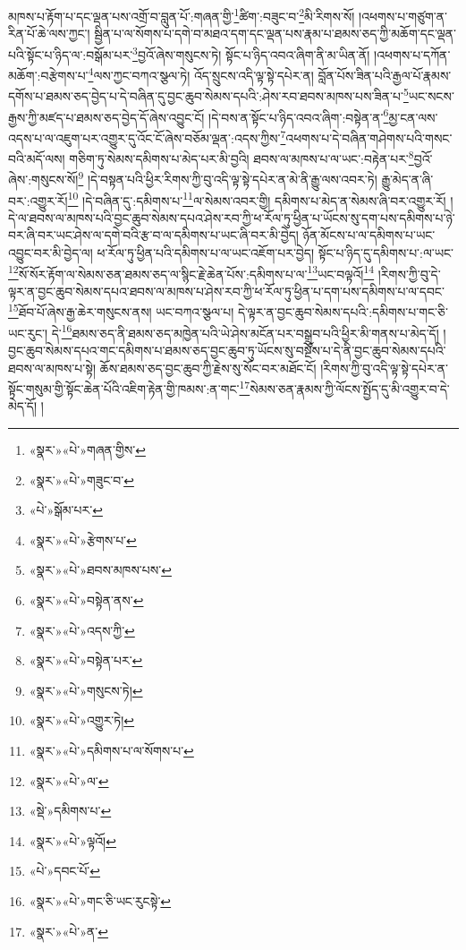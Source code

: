 མཁས་པ་རྟོག་པ་དང་ལྡན་པས་འགྲོ་བ་བླུན་པོ་:གཞན་གྱི་\footnote{«སྣར་»«པེ་»གཞན་གྱིས་}ཚིག་:བཟུང་བ་\footnote{«སྣར་»«པེ་»གཟུང་བ་}མི་རིགས་སོ། །འཕགས་པ་གཙུག་ན་རིན་པོ་ཆེ་ལས་ཀྱང་། སྦྱིན་པ་ལ་སོགས་པ་དགེ་བ་མཐའ་དག་དང་ལྡན་པས་རྣམ་པ་ཐམས་ཅད་ཀྱི་མཆོག་དང་ལྡན་པའི་སྟོང་པ་ཉིད་ལ་:བསྒོམ་པར་\footnote{«པེ་»སྒོམ་པར་}བྱའོ་ཞེས་གསུངས་ཏེ། སྟོང་པ་ཉིད་འབའ་ཞིག་ནི་མ་ཡིན་ནོ། །འཕགས་པ་དཀོན་མཆོག་:བརྩེགས་པ་\footnote{«སྣར་»«པེ་»རྩེགས་པ་}ལས་ཀྱང་བཀའ་སྩལ་ཏེ། འོད་སྲུངས་འདི་ལྟ་སྟེ་དཔེར་ན། བློན་པོས་ཟིན་པའི་རྒྱལ་པོ་རྣམས་དགོས་པ་ཐམས་ཅད་བྱེད་པ་དེ་བཞིན་དུ་བྱང་ཆུབ་སེམས་དཔའི་:ཤེས་རབ་ཐབས་མཁས་པས་ཟིན་པ་\footnote{«སྣར་»«པེ་»ཐབས་མཁས་པས་}ཡང་སངས་རྒྱས་ཀྱི་མཛད་པ་ཐམས་ཅད་བྱེད་དོ་ཞེས་འབྱུང་ངོ། །དེ་བས་ན་སྟོང་པ་ཉིད་འབའ་ཞིག་:བསྟེན་ན་\footnote{«སྣར་»«པེ་»བསྟེན་ནས་}མྱ་ངན་ལས་འདས་པ་ལ་འཇུག་པར་འགྱུར་དུ་འོང་ངོ་ཞེས་བཅོམ་ལྡན་:འདས་ཀྱིས་\footnote{«སྣར་»«པེ་»འདས་ཀྱི་}འཕགས་པ་དེ་བཞིན་གཤེགས་པའི་གསང་བའི་མདོ་ལས། གཅིག་ཏུ་སེམས་དམིགས་པ་མེད་པར་མི་བྱའི། ཐབས་ལ་མཁས་པ་ལ་ཡང་:བརྟེན་པར་\footnote{«སྣར་»«པེ་»བསྟེན་པར་}བྱའོ་ཞེས་:གསུངས་སོ།\footnote{«སྣར་»«པེ་»གསུངས་ཏེ།} །དེ་བསྟན་པའི་ཕྱིར་རིགས་ཀྱི་བུ་འདི་ལྟ་སྟེ་དཔེར་ན་མེ་ནི་རྒྱུ་ལས་འབར་ཏེ། རྒྱུ་མེད་ན་ཞི་བར་:འགྱུར་རོ།\footnote{«སྣར་»«པེ་»འགྱུར་ཏེ།} །དེ་བཞིན་དུ་:དམིགས་པ་\footnote{«སྣར་»«པེ་»དམིགས་པ་ལ་སོགས་པ་}ལ་སེམས་འབར་གྱི། དམིགས་པ་མེད་ན་སེམས་ཞི་བར་འགྱུར་རོ། །དེ་ལ་ཐབས་ལ་མཁས་པའི་བྱང་ཆུབ་སེམས་དཔའ་ཤེས་རབ་ཀྱི་ཕ་རོལ་ཏུ་ཕྱིན་པ་ཡོངས་སུ་དག་པས་དམིགས་པ་ཉེ་བར་ཞི་བར་ཡང་ཤེས་ལ་དགེ་བའི་རྩ་བ་ལ་དམིགས་པ་ཡང་ཞི་བར་མི་བྱེད། ཉོན་མོངས་པ་ལ་དམིགས་པ་ཡང་འབྱུང་བར་མི་བྱེད་ལ། ཕ་རོལ་ཏུ་ཕྱིན་པའི་དམིགས་པ་ལ་ཡང་འཇོག་པར་བྱེད། སྟོང་པ་ཉིད་དུ་དམིགས་པ་:ལ་ཡང་\footnote{«སྣར་»«པེ་»ལ་}སོ་སོར་རྟོག་ལ་སེམས་ཅན་ཐམས་ཅད་ལ་སྙིང་རྗེ་ཆེན་པོས་:དམིགས་པ་ལ་\footnote{«སྡེ་»དམིགས་པ་}ཡང་བལྟའོ།\footnote{«སྣར་»«པེ་»ལྟའོ།} །རིགས་ཀྱི་བུ་དེ་ལྟར་ན་བྱང་ཆུབ་སེམས་དཔའ་ཐབས་ལ་མཁས་པ་ཤེས་རབ་ཀྱི་ཕ་རོལ་ཏུ་ཕྱིན་པ་དག་པས་དམིགས་པ་ལ་དབང་\footnote{«པེ་»དབང་པོ་}ཐོབ་པོ་ཞེས་རྒྱ་ཆེར་གསུངས་ནས། ཡང་བཀའ་སྩལ་པ། དེ་ལྟར་ན་བྱང་ཆུབ་སེམས་དཔའི་:དམིགས་པ་གང་ཅི་ཡང་རུང་། དེ་\footnote{«སྣར་»«པེ་»གང་ཅི་ཡང་རུངསྟེ་}ཐམས་ཅད་ནི་ཐམས་ཅད་མཁྱེན་པའི་ཡེ་ཤེས་མངོན་པར་བསྒྲུབ་པའི་ཕྱིར་མི་གནས་པ་མེད་དོ། །བྱང་ཆུབ་སེམས་དཔའ་གང་དམིགས་པ་ཐམས་ཅད་བྱང་ཆུབ་ཏུ་ཡོངས་སུ་བསྔོས་པ་དེ་ནི་བྱང་ཆུབ་སེམས་དཔའི་ཐབས་ལ་མཁས་པ་སྟེ། ཆོས་ཐམས་ཅད་བྱང་ཆུབ་ཀྱི་རྗེས་སུ་སོང་བར་མཐོང་ངོ། །རིགས་ཀྱི་བུ་འདི་ལྟ་སྟེ་དཔེར་ན་སྟོང་གསུམ་གྱི་སྟོང་ཆེན་པོའི་འཇིག་རྟེན་གྱི་ཁམས་:ན་གང་\footnote{«སྣར་»«པེ་»ན་}སེམས་ཅན་རྣམས་ཀྱི་ལོངས་སྤྱོད་དུ་མི་འགྱུར་བ་དེ་མེད་དོ། །
